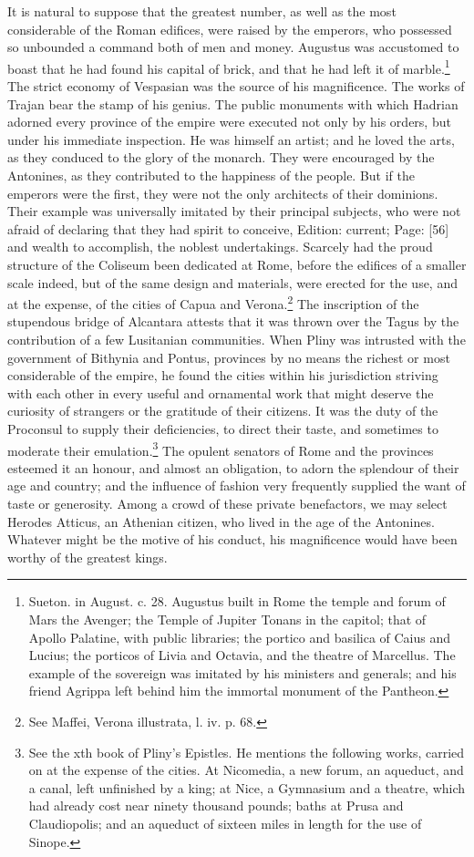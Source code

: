It is natural to suppose that the greatest number, as well as the most considerable of the Roman edifices, were raised by the emperors, who possessed so unbounded a command both of men and money. Augustus was accustomed to boast that he had found his capital of brick, and that he had left it of marble.\footnote{Sueton. in August. c. 28. Augustus built in Rome the temple and forum of Mars the Avenger; the Temple of Jupiter Tonans in the capitol; that of Apollo Palatine, with public libraries; the portico and basilica of Caius and Lucius; the porticos of Livia and Octavia, and the theatre of Marcellus. The example of the sovereign was imitated by his ministers and generals; and his friend Agrippa left behind him the immortal monument of the Pantheon.} The strict economy of Vespasian was the source of his magnificence. The works of Trajan bear the stamp of his genius. The public monuments with which Hadrian adorned every province of the empire were executed not only by his orders, but under his immediate inspection. He was himself an artist; and he loved the arts, as they conduced to the glory of the monarch. They were encouraged by the Antonines, as they contributed to the happiness of the people. But if the emperors were the first, they were not the only architects of their dominions. Their example was universally imitated by their principal subjects, who were not afraid of declaring that they had spirit to conceive, Edition: current; Page: [56] and wealth to accomplish, the noblest undertakings. Scarcely had the proud structure of the Coliseum been dedicated at Rome, before the edifices of a smaller scale indeed, but of the same design and materials, were erected for the use, and at the expense, of the cities of Capua and Verona.\footnote{See Maffei, Verona illustrata, l. iv. p. 68.} The inscription of the stupendous bridge of Alcantara attests that it was thrown over the Tagus by the contribution of a few Lusitanian communities. When Pliny was intrusted with the government of Bithynia and Pontus, provinces by no means the richest or most considerable of the empire, he found the cities within his jurisdiction striving with each other in every useful and ornamental work that might deserve the curiosity of strangers or the gratitude of their citizens. It was the duty of the Proconsul to supply their deficiencies, to direct their taste, and sometimes to moderate their emulation.\footnote{See the xth book of Pliny\texthebrew{}’s Epistles. He mentions the following works, carried on at the expense of the cities. At Nicomedia, a new forum, an aqueduct, and a canal, left unfinished by a king; at Nice, a Gymnasium and a theatre, which had already cost near ninety thousand pounds; baths at Prusa and Claudiopolis; and an aqueduct of sixteen miles in length for the use of Sinope.} The opulent senators of Rome and the provinces esteemed it an honour, and almost an obligation, to adorn the splendour of their age and country; and the influence of fashion very frequently supplied the want of taste or generosity. Among a crowd of these private benefactors, we may select Herodes Atticus, an Athenian citizen, who lived in the age of the Antonines. Whatever might be the motive of his conduct, his magnificence would have been worthy of the greatest kings.

